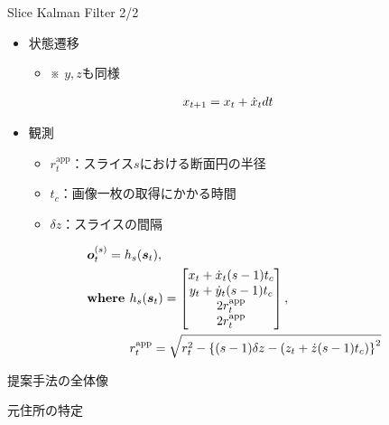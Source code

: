\begin{frame}[noframenumbering]{Slice Kalman Filter 2/2}
    \begin{itemize}
        \item 状態遷移
        \begin{itemize}
            \item ※ $y,z$も同様
        \end{itemize}
    \end{itemize}
    \begin{equation}
        \notag
        \begin{aligned}
            & x_{t+1} = x_t + \dot{x}_t dt
        \end{aligned}
    \end{equation}
    \begin{itemize}
        \item 観測
        \begin{itemize}
            \item $r_t^{\text{app}}$：スライス$s$における断面円の半径
            \item $t_c$：画像一枚の取得にかかる時間
            \item $\delta z$：スライスの間隔
        \end{itemize}
    \end{itemize}
    \begin{equation}
        \notag
        \begin{aligned}
            & \bm{o}_t^{(s)} = h_s(\bm{s}_t),
            \\ & \textbf{where } h_s(\bm{s}_t) = \begin{bmatrix}
                x_t + \dot{x}_t (s-1) t_c
                \\ y_t + \dot{y}_t (s-1) t_c
                \\ 2 r_t^{\text{app}}
                \\ 2 r_t^{\text{app}}
            \end{bmatrix},
            \\ & \phantom{\textbf{where }} r_t^{\text{app}} = \sqrt{r_t^2 - \left\{(s-1) \delta z - (z_t + \dot{z} (s-1) t_c)\right\}^2}
        \end{aligned}
    \end{equation}
\end{frame}

\begin{frame}[noframenumbering]{提案手法の全体像}
\end{frame}


\begin{frame}[noframenumbering]{元住所の特定}
\end{frame}